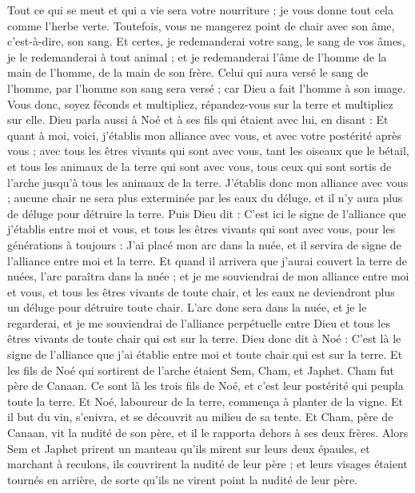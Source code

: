 \begin{multicols}{2}
Tout ce qui se meut et qui a vie sera votre nourriture ; je vous donne tout cela comme l'herbe verte.
Toutefois, vous ne mangerez point de chair avec son âme, c'est-à-dire, son sang.
Et certes, je redemanderai votre sang, le sang de vos âmes, je le redemanderai à tout animal ; et je redemanderai l'âme de l'homme de la main de l'homme, de la main de son frère.
Celui qui aura versé le sang de l'homme, par l'homme son sang sera versé ; car Dieu a fait l'homme à son image.
Vous donc, soyez féconds et multipliez, répandez-vous sur la terre et multipliez sur elle.
Dieu parla aussi à Noé et à ses fils qui étaient avec lui, en disant :
Et quant à moi, voici, j'établis mon alliance avec vous, et avec votre postérité après vous ;
avec tous les êtres vivants qui sont avec vous, tant les oiseaux que le bétail, et tous les animaux de la terre qui sont avec vous, tous ceux qui sont sortis de l'arche jusqu'à tous les animaux de la terre.
J'établis donc mon alliance avec vous ; aucune chair ne sera plus exterminée par les eaux du déluge, et il n'y aura plus de déluge pour détruire la terre.
Puis Dieu dit : C'est ici le signe de l'alliance que j'établis entre moi et vous, et tous les êtres vivants qui sont avec vous, pour les générations à toujours :
J'ai placé mon arc dans la nuée, et il servira de signe de l'alliance entre moi et la terre.
Et quand il arrivera que j'aurai couvert la terre de nuées, l'arc paraîtra dans la nuée ;
et je me souviendrai de mon alliance entre moi et vous, et tous les êtres vivants de toute chair, et les eaux ne deviendront plus un déluge pour détruire toute chair.
L'arc donc sera dans la nuée, et je le regarderai, et je me souviendrai de l'alliance perpétuelle entre Dieu et tous les êtres vivants de toute chair qui est sur la terre.
Dieu donc dit à Noé : C'est là le signe de l'alliance que j'ai établie entre moi et toute chair qui est sur la terre.
Et les fils de Noé qui sortirent de l'arche étaient Sem, Cham, et Japhet. Cham fut père de Canaan.
Ce sont là les trois fils de Noé, et c'est leur postérité qui peupla toute la terre.
Et Noé, laboureur de la terre, commença à planter de la vigne.
Et il but du vin, s'enivra, et se découvrit au milieu de sa tente.
Et Cham, père de Canaan, vit la nudité de son père, et il le rapporta dehors à ses deux frères.
Alors Sem et Japhet prirent un manteau qu'ils mirent sur leurs deux épaules, et marchant à reculons, ils couvrirent la nudité de leur père ; et leurs visages étaient tournés en arrière, de sorte qu'ils ne virent point la nudité de leur père.

\end{multicols}

